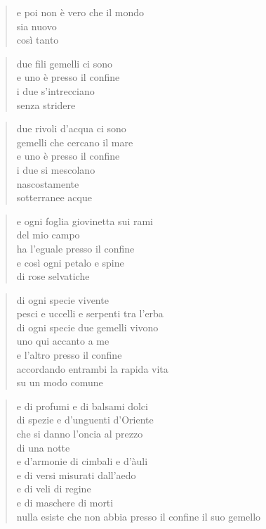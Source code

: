 	\begin{verse}
		e poi non è vero che il mondo\\
		sia nuovo\\
		così tanto
	\end{verse}

\clearpage


\vspace*{2cm}

	\begin{verse}
		due fili gemelli ci sono\\
		e uno è presso il confine\\
		i due s’intrecciano\\
		senza stridere
	\end{verse}

	\begin{verse}
		due rivoli d’acqua ci sono\\
		gemelli che cercano il mare\\
		e uno è presso il confine\\
		i due si mescolano\\
		nascostamente\\
		sotterranee acque
	\end{verse}

	\begin{verse}
		e ogni foglia giovinetta sui rami\\
		del mio campo\\
		ha l’eguale presso il confine\\
		e così ogni petalo e spine\\
		di rose selvatiche
	\end{verse}

	\begin{verse}
		di ogni specie vivente\\
		pesci e uccelli e serpenti tra l’erba\\
		di ogni specie due gemelli vivono\\
		uno qui accanto a me\\
		e l’altro presso il confine\\
		accordando entrambi la rapida vita\\
		su un modo comune
	\end{verse}

	\begin{verse}
		e di profumi e di balsami dolci\\
		di spezie e d’unguenti d’Oriente\\
		che si danno l’oncia al prezzo\\
		di una notte\\
		e d’armonie di cimbali e d’àuli\\
		e di versi misurati dall’aedo\\
		e di veli di regine\\
		e di maschere di morti\\
		nulla esiste che non abbia
		presso il confine il suo gemello
	\end{verse}


